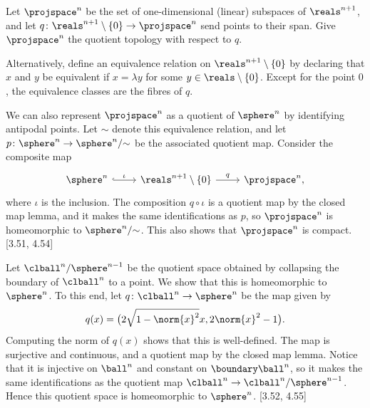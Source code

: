 \documentclass[article, a4paper, 11pt, oneside]{memoir}
\numberwithin{equation}{chapter}
\begin{document}
\begin{example}
    Let $\projspace^n$ be the set of one-dimensional (linear) subspaces of $\reals^{n+1}$, and let $q \colon \reals^{n+1} \setminus \{0\} \to \projspace^n$ send points to their span. Give $\projspace^n$ the quotient topology with respect to $q$.

    Alternatively, define an equivalence relation on $\reals^{n+1} \setminus \{0\}$ by declaring that $x$ and $y$ be equivalent if $x = \lambda y$ for some $y \in \reals \setminus \{0\}$. Except for the point $0$, the equivalence classes are the fibres of $q$.

    We can also represent $\projspace^n$ as a quotient of $\sphere^n$ by identifying antipodal points. Let $\sim$ denote this equivalence relation, and let $p \colon \sphere^n \to \sphere^n/{\sim}$ be the associated quotient map. Consider the composite map
    \begin{equation*}
        \begin{tikzcd}
            \sphere^n
                \ar[r, hook, "\iota"]
            & \reals^{n+1} \setminus \{0\}
                \ar[r, "q"]
            & \projspace^n,
        \end{tikzcd}
    \end{equation*}
    where $\iota$ is the inclusion. The composition $q \circ \iota$ is a quotient map by the closed map lemma, and it makes the same identifications as $p$, so $\projspace^n$ is homeomorphic to $\sphere^n/{\sim}$. This also shows that $\projspace^n$ is compact. [3.51, 4.54]
\end{example}


\begin{example}
    Let $\clball^n/\sphere^{n-1}$ be the quotient space obtained by collapsing the boundary of $\clball^n$ to a point. We show that this is homeomorphic to $\sphere^n$. To this end, let $q \colon \clball^n \to \sphere^n$ be the map given by
    \begin{equation*}
        q(x) = \bigl(
            2 \sqrt{1 - \norm{x}^2} x,
            2 \norm{x}^2 - 1
        \bigr).
    \end{equation*}
    Computing the norm of $q(x)$ shows that this is well-defined. The map is surjective and continuous, and a quotient map by the closed map lemma. Notice that it is injective on $\ball^n$ and constant on $\boundary\ball^n$, so it makes the same identifications as the quotient map $\clball^n \to \clball^n/\sphere^{n-1}$. Hence this quotient space is homeomorphic to $\sphere^n$. [3.52, 4.55]
\end{example}
\end{document}

